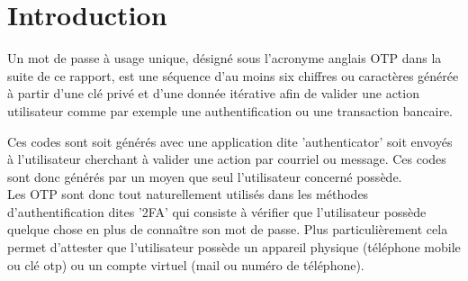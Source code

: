 \documentclass[a4paper, 10pt]{article}
\newcommand{\otp}{\textsc{OTP} }
\newcommand{\totp}{\textsc{TOTP} }
\newcommand{\hotp}{\textsc{HOTP} }
\begin{document}
\newpage

\tableofcontents
\newpage

\begin{abstract}
Ce rapport introduit les différents concepts inhérents à \textcolor{mygreen}{l'algorithme \otp} en prenant l'exemple de son utilisation dans le \textcolor{myblue}{protocole 2FA}. Ensuite il explique en détaille et en déroulant un exemple concret, les différentes partie de l'algorithme permettant de générer un \otp à partir d'une \textcolor{mygreen}{clé privé} partagé et d'une \textcolor{mygreen}{donnée incrémentale}. Puis il montre la mise en place du 2FA avec les deux \textcolor{myblue}{variantes} d'\otp, \textcolor{myblue}{\hotp} et \textcolor{myblue}{\totp}, sur un prototype réalisé en \textcolor{myblue}{python}. Finalement, ce rapport conclus en mettant en exergue les \textcolor{myblue}{failles de sécurités} possible à l'utilisation d'\otp et quelles sont les bonnes pratiques à mettre en place pour s'en prémunir.
\end{abstract}
\newpage


    \section*{Introduction}



    Un \textcolor{myblue}{mot de passe à usage unique}, désigné sous l'acronyme anglais \textcolor{myblue}{\otp} dans la suite de ce rapport, 
est une séquence d'au moins \textcolor{mygreen}{six chiffres} ou caractères générée à partir d'une \textcolor{mygreen}{clé privé} et d'une \textcolor{mygreen}{donnée itérative}
afin de \textcolor{myblue}{valider une action} utilisateur comme par exemple une authentification ou une transaction bancaire. 

    Ces codes sont soit générés avec une \textcolor{myblue}{application} dite 'authenticator' soit \textcolor{myblue}{envoyés} à l'utilisateur cherchant
à valider une action par courriel ou message. Ces codes sont donc générés par un moyen que \textcolor{mygreen}{seul l'utilisateur concerné possède}.\\


    Les \otp  sont donc tout naturellement utilisés dans les méthodes d'authentification dites '\textcolor{myblue}{2FA}'  qui consiste à vérifier que
l'utilisateur \textcolor{myblue}{possède quelque chose} en plus de connaître son mot de passe.
Plus particulièrement cela permet d'attester que l'utilisateur possède \textcolor{mygreen}{un appareil physique} (téléphone mobile ou clé otp) ou \textcolor{mygreen}{un compte virtuel} (mail ou numéro de téléphone).\\
\end{document}
